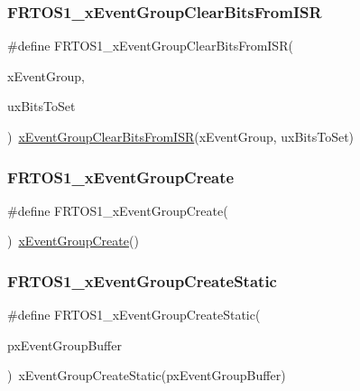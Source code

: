 \subsubsection{\texorpdfstring{F\+R\+T\+O\+S1\+\_\+x\+Event\+Group\+Clear\+Bits\+From\+I\+SR}{FRTOS1\_xEventGroupClearBitsFromISR}}
{\footnotesize\ttfamily \#define F\+R\+T\+O\+S1\+\_\+x\+Event\+Group\+Clear\+Bits\+From\+I\+SR(\begin{DoxyParamCaption}\item[{}]{x\+Event\+Group,  }\item[{}]{ux\+Bits\+To\+Set }\end{DoxyParamCaption})~\hyperlink{event__groups_8h_a3d7de214a697f33fe7b914e26a93f33a}{x\+Event\+Group\+Clear\+Bits\+From\+I\+SR}(x\+Event\+Group, ux\+Bits\+To\+Set)}

\mbox{\label{group___f_r_t_o_s1__module_ga8a23ed0874763be44263ff417691b7f0}} 
\subsubsection{\texorpdfstring{F\+R\+T\+O\+S1\+\_\+x\+Event\+Group\+Create}{FRTOS1\_xEventGroupCreate}}
{\footnotesize\ttfamily \#define F\+R\+T\+O\+S1\+\_\+x\+Event\+Group\+Create(\begin{DoxyParamCaption}{ }\end{DoxyParamCaption})~\hyperlink{event__groups_8c_a2e8622ce280fff2f60ad867dff0a4519}{x\+Event\+Group\+Create}()}

\mbox{\label{group___f_r_t_o_s1__module_gac9eec6e9aa8177a4b977c9923a8ad084}} 
\subsubsection{\texorpdfstring{F\+R\+T\+O\+S1\+\_\+x\+Event\+Group\+Create\+Static}{FRTOS1\_xEventGroupCreateStatic}}
{\footnotesize\ttfamily \#define F\+R\+T\+O\+S1\+\_\+x\+Event\+Group\+Create\+Static(\begin{DoxyParamCaption}\item[{}]{px\+Event\+Group\+Buffer }\end{DoxyParamCaption})~x\+Event\+Group\+Create\+Static(px\+Event\+Group\+Buffer)}

